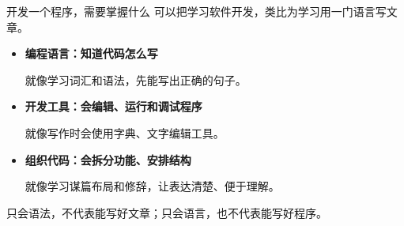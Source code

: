 \documentclass[aspectratio=169]{beamer}
\begin{document}

\begin{frame}{开发一个程序，需要掌握什么}
  可以把学习软件开发，类比为学习用一门语言写文章。
  \par\bigskip
  \begin{itemize}
    \item \textbf{编程语言：知道代码怎么写}\par
      就像学习词汇和语法，先能写出正确的句子。
    \item \textbf{开发工具：会编辑、运行和调试程序}\par
      就像写作时会使用字典、文字编辑工具。
    \item \textbf{组织代码：会拆分功能、安排结构}\par
      就像学习谋篇布局和修辞，让表达清楚、便于理解。
  \end{itemize}
  \bigskip
  \alert{只会语法，不代表能写好文章；只会语言，也不代表能写好程序。}
\end{frame}
\end{document}

